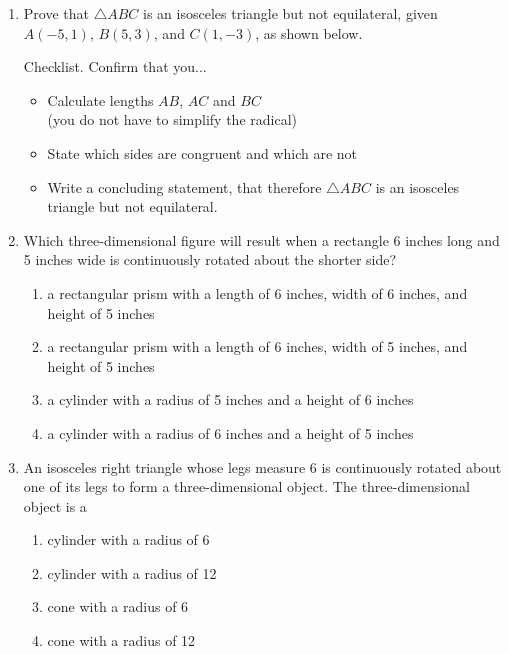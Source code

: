 \documentclass[12pt, twoside]{article}
\begin{document}
\begin{enumerate}
\newpage
   \item Prove that $\triangle ABC$ is an isosceles triangle but not equilateral, given $A(-5,1)$, $B(5,3)$, and $C(1,-3)$, as shown below.
     \begin{multicols}{2}
       Checklist. Confirm that you...
       \begin{itemize}
         \item Calculate lengths $AB$, $AC$ and $BC$\\
         (you do not have to simplify the radical)
         \item State which sides are congruent and which are not
         \item Write a concluding statement, that therefore $\triangle ABC$ is an isosceles triangle but not equilateral.
       \end{itemize}
     \end{multicols}

 \newpage
   \item Which three-dimensional figure will result when a rectangle 6 inches long and 5 inches wide is continuously rotated about the shorter side?
     \begin{enumerate}
       \item a rectangular prism with a length of 6 inches, width of 6 inches, and height of 5 inches
       \item a rectangular prism with a length of 6 inches, width of 5 inches, and height of 5 inches
       \item a cylinder with a radius of 5 inches and a height of 6 inches
       \item a cylinder with a radius of 6 inches and a height of 5 inches
     \end{enumerate} \vspace{1cm}

  \item An isosceles right triangle whose legs measure 6 is continuously rotated about one of its legs to form a three-dimensional object. The three-dimensional object is a
   \begin{enumerate}
     \item cylinder with a radius of 6
     \item cylinder with a radius of 12
     \item cone with a radius of 6
     \item cone with a radius of 12
   \end{enumerate} \vspace{1cm}


\end{enumerate}
\end{document}
